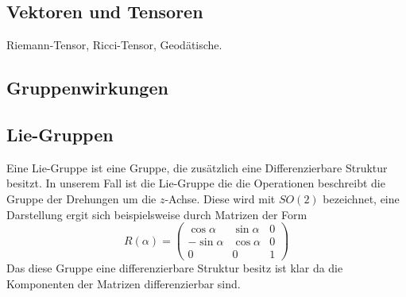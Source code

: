 \subsection{Vektoren und Tensoren}
Riemann-Tensor, Ricci-Tensor, Geodätische.
\subsection{Gruppenwirkungen}
\subsection{Lie-Gruppen}
Eine Lie-Gruppe ist eine Gruppe, die zusätzlich eine Differenzierbare Struktur
besitzt.
In unserem Fall ist die Lie-Gruppe die die Operationen beschreibt die Gruppe der
Drehungen um die $z$-Achse. Diese wird mit $SO(2)$ bezeichnet, eine Darstellung
ergit sich beispielsweise durch Matrizen der Form
\begin{equation}
R(\alpha)=
\begin{pmatrix}
\cos\alpha&\sin\alpha&0\\
-\sin\alpha&\cos\alpha&0\\
0&0&1
\end{pmatrix}
\end{equation}
Das diese Gruppe eine differenzierbare Struktur besitz ist klar da die
Komponenten der Matrizen differenzierbar sind.
\begin{definition}

\end{definition}

